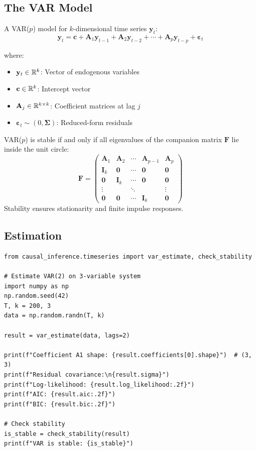 \subsection{The VAR Model}

A VAR($p$) model for $k$-dimensional time series $\mathbf{y}_t$:
\begin{equation}
\mathbf{y}_t = \mathbf{c} + \mathbf{A}_1 \mathbf{y}_{t-1} + \mathbf{A}_2 \mathbf{y}_{t-2} + \cdots + \mathbf{A}_p \mathbf{y}_{t-p} + \boldsymbol{\varepsilon}_t
\label{eq:var-p}
\end{equation}

where:
\begin{itemize}
    \item $\mathbf{y}_t \in \mathbb{R}^k$: Vector of endogenous variables
    \item $\mathbf{c} \in \mathbb{R}^k$: Intercept vector
    \item $\mathbf{A}_j \in \mathbb{R}^{k \times k}$: Coefficient matrices at lag $j$
    \item $\boldsymbol{\varepsilon}_t \sim (0, \boldsymbol{\Sigma})$: Reduced-form residuals
\end{itemize}

\begin{definition}
VAR($p$) is stable if and only if all eigenvalues of the companion matrix $\mathbf{F}$ lie inside the unit circle:
\begin{equation}
\mathbf{F} = \begin{pmatrix}
\mathbf{A}_1 & \mathbf{A}_2 & \cdots & \mathbf{A}_{p-1} & \mathbf{A}_p \\
\mathbf{I}_k & \mathbf{0} & \cdots & \mathbf{0} & \mathbf{0} \\
\mathbf{0} & \mathbf{I}_k & \cdots & \mathbf{0} & \mathbf{0} \\
\vdots & & \ddots & & \vdots \\
\mathbf{0} & \mathbf{0} & \cdots & \mathbf{I}_k & \mathbf{0}
\end{pmatrix}
\end{equation}
Stability ensures stationarity and finite impulse responses.
\end{definition}

\subsection{Estimation}

\begin{verbatim}
from causal_inference.timeseries import var_estimate, check_stability

# Estimate VAR(2) on 3-variable system
import numpy as np
np.random.seed(42)
T, k = 200, 3
data = np.random.randn(T, k)

result = var_estimate(data, lags=2)

print(f"Coefficient A1 shape: {result.coefficients[0].shape}")  # (3, 3)
print(f"Residual covariance:\n{result.sigma}")
print(f"Log-likelihood: {result.log_likelihood:.2f}")
print(f"AIC: {result.aic:.2f}")
print(f"BIC: {result.bic:.2f}")

# Check stability
is_stable = check_stability(result)
print(f"VAR is stable: {is_stable}")
\end{verbatim}

